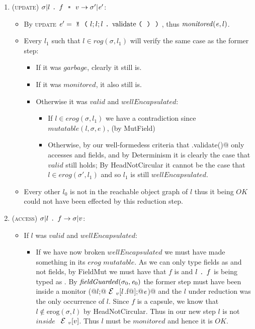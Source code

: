 \begin{enumerate}
\item (\textsc{update}) $\sigma|l\singleDot f\equals v\rightarrow \sigma'|\e'$:
	\begin{itemize}
	  \item By \textsc{update} $\e'=\Kw{M}\oR l;l;l\singleDot\text{validate}\oR\cR\cR$, thus $\mathit{monitored}({\mathit{e}},l)$.
	  \item Every $l_1$ such that $l\in \mathit{rog}(\sigma,l_1)$ will verify the same case as the former step:
	  \begin{itemize}
	  	\item If it was $\mathit{garbage}$, clearly it still is.
	  	\item If it was $\mathit{monitored}$, it also still is.
	    \item Otherwise it was $\mathit{valid}$ and $\mathit{wellEncapsulated}$:
			\begin{itemize}
				\item If $l\in \mathit{erog}(\sigma,l_1)$ we have a contradiction since $mutatable(l, \sigma, e)$, (by MutField)
		    	\item Otherwise, by our well-formedess criteria that \Q@.validate()@ only accesses \Q@imm@ and \Q@capsule@ fields, and by Determinism it is clearly the case that $\mathit{valid}$ still holds;
				By HeadNotCircular it cannot be the case that $l\in \mathit{erog}(\sigma',l_1)$ and so $l_1$ is still $\mathit{wellEncapsulated}$.
		  	\end{itemize}
	  \end{itemize}
	  \item Every other $l_0$ is not in the reachable object graph of $l$
	  thus it being $\mathit{OK}$ could not have been effected by this reduction step.
	\end{itemize}

\item (\textsc{access}) $\sigma|l\singleDot f \rightarrow \sigma|v$:
	\begin{itemize}
		\item If $l$ was $valid$ and $wellEncapsulated$:
		\begin{itemize}
			\item If we have now broken $wellEncapsulated$ we must have made something in its $erog$  $mutatable$. As we can only type \Q@capsule@ fields as \Q@mut@ and not \Q@imm@ fields, by FieldMut we must have that $f$ is \Q@capsule@ and $l{ \mbox{ {\texttt{.}} } } f$ is being typed as \Q@mut@. By $\mathit{fieldGuarded}(\sigma_0,\e_0)$ the former step must have been inside a monitor \Q@M(@$l$\Q@;@$\ctx_v[l$\Q@.f@$]$\Q@;@${\mathit{e}}$\Q@)@
		    and the $l$ under reduction was the only occurrence of $l$.
		    Since $f$ is a capsule, we know that $l\notin \text{erog}(\sigma,l)$
		    by HeadNotCircular. Thus in our new step $l$ is not $inside$ $\ctx_v[v]$. Thus $l$ must be $monitored$ and hence it is $OK$.


\end{itemize}
\end{itemize}
\end{enumerate}
